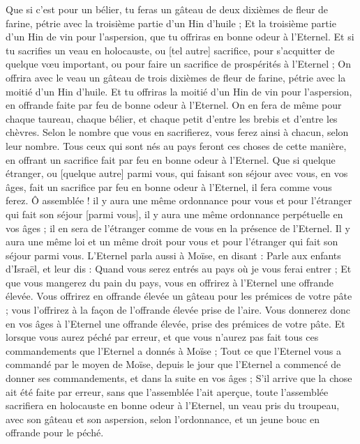 \begin{multicols}{2}
Que si c'est pour un bélier, tu feras un gâteau de deux dixièmes de fleur de farine, pétrie avec la troisième partie d'un Hin d'huile ;
Et la troisième partie d'un Hin de vin pour l'aspersion, que tu offriras en bonne odeur à l'Eternel.
Et si tu sacrifies un veau en holocauste, ou [tel autre] sacrifice, pour s'acquitter de quelque vœu important, ou pour faire un sacrifice de prospérités à l'Eternel ;
On offrira avec le veau un gâteau de trois dixièmes de fleur de farine, pétrie avec la moitié d'un Hin d'huile.
Et tu offriras la moitié d'un Hin de vin pour l'aspersion, en offrande faite par feu de bonne odeur à l'Eternel.
On en fera de même pour chaque taureau, chaque bélier, et chaque petit d'entre les brebis et d'entre les chèvres.
Selon le nombre que vous en sacrifierez, vous ferez ainsi à chacun, selon leur nombre.
Tous ceux qui sont nés au pays feront ces choses de cette manière, en offrant un sacrifice fait par feu en bonne odeur à l'Eternel.
Que si quelque étranger, ou [quelque autre] parmi vous, qui faisant son séjour avec vous, en vos âges, fait un sacrifice par feu en bonne odeur à l'Eternel, il fera comme vous ferez.
Ô assemblée ! il y aura une même ordonnance pour vous et pour l'étranger qui fait son séjour [parmi vous], il y aura une même ordonnance perpétuelle en vos âges ; il en sera de l'étranger comme de vous en la présence de l'Eternel.
Il y aura une même loi et un même droit pour vous et pour l'étranger qui fait son séjour parmi vous.
L'Eternel parla aussi à Moïse, en disant :
Parle aux enfants d'Israël, et leur dis : Quand vous serez entrés au pays où je vous ferai entrer ;
Et que vous mangerez du pain du pays, vous en offrirez à l'Eternel une offrande élevée.
Vous offrirez en offrande élevée un gâteau pour les prémices de votre pâte ; vous l'offrirez à la façon de l'offrande élevée prise de l'aire.
Vous donnerez donc en vos âges à l'Eternel une offrande élevée, prise des prémices de votre pâte.
Et lorsque vous aurez péché par erreur, et que vous n'aurez pas fait tous ces commandements que l'Eternel a donnés à Moïse ;
Tout ce que l'Eternel vous a commandé par le moyen de Moïse, depuis le jour que l'Eternel a commencé de donner ses commandements, et dans la suite en vos âges ;
S'il arrive que la chose ait été faite par erreur, sans que l'assemblée l'ait aperçue, toute l'assemblée sacrifiera en holocauste en bonne odeur à l'Eternel, un veau pris du troupeau, avec son gâteau et son aspersion, selon l'ordonnance, et un jeune bouc en offrande pour le péché.

\end{multicols}
